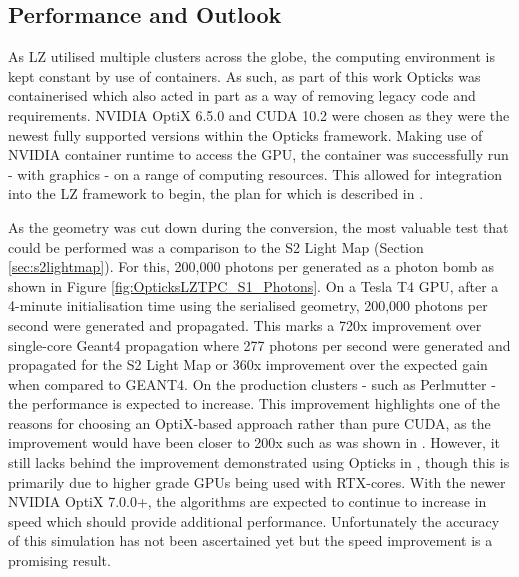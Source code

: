 \subsection{Performance and Outlook}
\par
As LZ utilised multiple clusters across the globe, the computing environment is kept constant by use of containers.
As such, as part of this work Opticks was containerised \cite{opticks_docker_ref} which also acted in part as a way of removing legacy code and requirements.
NVIDIA OptiX 6.5.0 and CUDA 10.2 were chosen as they were the newest fully supported versions within the Opticks framework.
Making use of NVIDIA container runtime to access the GPU, the container was successfully run - with graphics - on a range of computing resources.
This allowed for integration into the LZ framework to begin, the plan for which is described in \cite{SEriksen_Opticks_CHEP_2021_ref,lz_status_with_opticks_ref}.
\par
As the geometry was cut down during the conversion, the most valuable test that could be performed was a comparison to the S2 Light Map (Section \ref{sec:s2lightmap}).
For this, 200,000 photons per generated as a photon bomb as shown in Figure \ref{fig:OpticksLZTPC_S1_Photons}.
On a Tesla T4 GPU, after a 4-minute initialisation time using the serialised geometry, 200,000 photons per second were generated and propagated.
This marks a 720x improvement over single-core Geant4 propagation where 277 photons per second were generated and propagated for the S2 Light Map or 360x improvement over the expected gain when compared to GEANT4.
On the production clusters - such as Perlmutter - the performance is expected to increase.
This improvement highlights one of the reasons for choosing an OptiX-based approach rather than pure CUDA, as the improvement would have been closer to 200x such as was shown in \cite{chroma_presentation_ref}.
However, it still lacks behind the improvement demonstrated using Opticks in \cite{Opticks_CHEP_2019_ref}, though this is primarily due to higher grade GPUs being used with RTX-cores.
With the newer NVIDIA OptiX 7.0.0+, the algorithms are expected to continue to increase in speed which should provide additional performance.
Unfortunately the accuracy of this simulation has not been ascertained yet but the speed improvement is a promising result.
